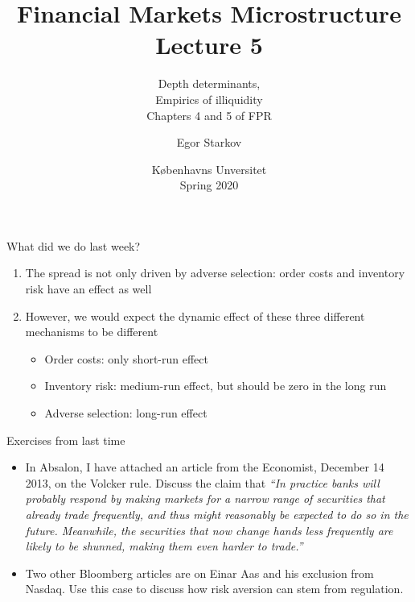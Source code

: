 \documentclass[english,10pt,aspectratio=169]{beamer}
\title{Financial Markets Microstructure \\ Lecture 5}
\subtitle{Depth determinants, \\ Empirics of illiquidity\\
	Chapters 4 and 5 of FPR}
\author{Egor Starkov}
\date{K{\o}benhavns Unversitet \\
	Spring 2020}
\begin{document}
	

\frame[plain]{\titlepage}


\begin{frame}{What did we do last week?}
	\begin{enumerate}
		\item The spread is not only driven by adverse selection: order costs and inventory risk have an effect as well
		\item However, we would expect the dynamic effect of these three different mechanisms to be different
		\begin{itemize}
			\item Order costs: only short-run effect 
			\item Inventory risk: medium-run effect, but should be zero in the long run
			\item Adverse selection: long-run effect 
		\end{itemize}
	\end{enumerate}
\end{frame}


\begin{frame}{Exercises from last time}
	\begin{itemize}
		\item In Absalon, I have attached an article from the Economist, December 14 2013, on the Volcker rule. Discuss the claim that \emph{``In practice banks will probably respond by making markets for a narrow range of securities that already trade frequently, and thus might reasonably be expected to do so in the future. Meanwhile, the securities that now change hands less frequently are likely to be shunned, making them even harder to trade.''}
		\item Two other Bloomberg articles are on Einar Aas and his exclusion from Nasdaq. Use this case to discuss how risk aversion can stem from regulation.
	\end{itemize}
\end{frame}
\end{document}
